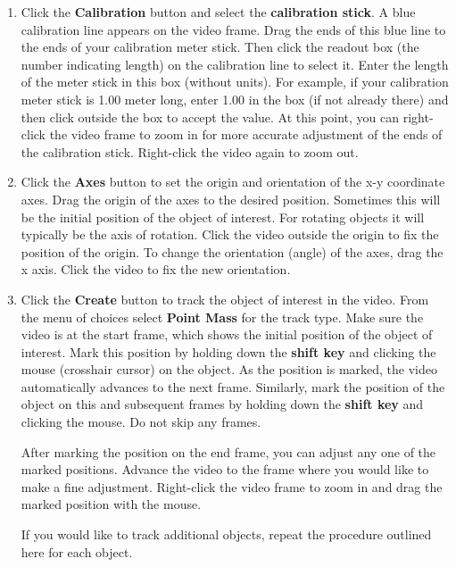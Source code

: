 \begin{enumerate}
\item Click the {\bf Calibration} button and select the {\bf calibration stick}. 
A blue calibration line appears on the video frame. 
Drag the ends of this blue line to the ends of your calibration meter stick. 
Then click the readout box (the number indicating length) on the calibration 
line to select it. 
Enter the length of the meter stick in this box (without units). 
For example, if your calibration meter stick is 1.00 meter long, enter 
1.00 in the box (if not already there) 
and then click outside the box to accept the value. 
At this point, you can right-click the video frame to zoom in for more accurate adjustment of the ends of the calibration stick. 
Right-click the video again to zoom out.

\item Click the {\bf Axes} button to set the origin and orientation of the x-y coordinate axes. 
Drag the origin of the axes to the desired position. Sometimes this will be the initial position of the object of interest. For rotating objects it will typically be the axis of rotation.
Click the video outside the origin to fix the position of the origin. 
To change the orientation (angle) of the axes, drag the x axis. 
Click the video to fix the new orientation.

\item Click the {\bf Create} button to track the object of interest in the video. 
From the menu of choices select {\bf Point Mass} for the track type. 
Make sure the video is at the start frame, which shows the initial position of the object of interest. 
Mark this position by holding down the {\bf shift key} and clicking the mouse (crosshair cursor) on the object. 
As the position is marked, the video automatically advances to the next frame. 
Similarly, mark the position of the object on this and subsequent frames by holding down the {\bf shift key} and clicking the mouse. 
Do not skip any frames. 

After marking the position on the end frame, you can adjust any one of the marked positions. 
Advance the video to the frame where you would like to make a fine adjustment. 
Right-click the video frame to zoom in and drag the marked position with the mouse.

If you would like to track additional objects, repeat the procedure outlined here for each object.


\end{enumerate}
